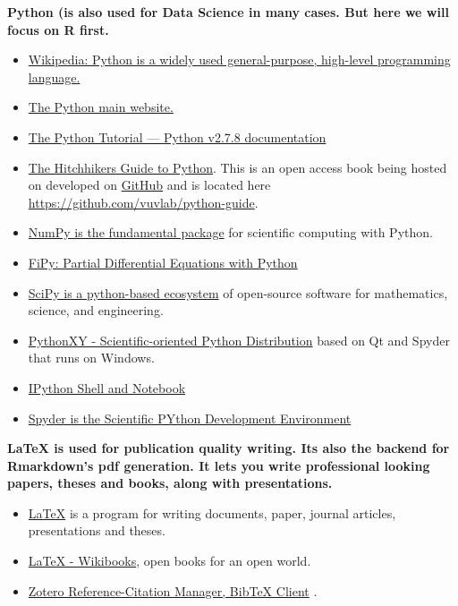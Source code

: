 \documentclass[10pt]{article} %
\begin{document}
  {\bf Python (is also used for Data Science in many cases.
    But here we will focus on R first. }
    \begin{itemize}
    	\item \href{"https://en.wikipedia.org/wiki/Python_(programming_language)"}{Wikipedia: Python is a widely used general-purpose, high-level programming language. }  \cite{python_python_2014}
    	\item \href{"https://www.python.org/"}{The Python main website. } \cite{python_python.org_2013}
    	\item \href{"https://docs.python.org/2/tutorial/"}{The Python Tutorial — Python v2.7.8 documentation}  \cite{python_python_2014}
    	\item \href{"http://docs.python-guide.org/en/latest/"}{The Hitchhikers Guide to Python}. This is an open access book being hosted on developed on \href{"https://github.com/"}{GitHub} and is located here \href{"https://github.com/vuvlab/python-guide"}{https://github.com/vuvlab/python-guide}. \cite{_hitchhikers_2014} \cite{_kennethreitz/python-guide_2014}
    	\item \href{"http://www.numpy.org"}{NumPy is the fundamental package} \cite{numpy_numpy_2014} for scientific computing with Python.
    	\item \href{"http://www.ctcms.nist.gov/fipy/"}{FiPy: Partial Differential Equations with Python} \cite{guyer_fipy:_2009}
    	\item \href{"http://www.scipy.org/"}{SciPy is a python-based ecosystem}  \cite{scipy_scipy.org_2014} of open-source software for mathematics, science, and engineering.
    	\item \href{"https://code.google.com/p/pythonxy/"}{PythonXY - Scientific-oriented Python Distribution} based on Qt and Spyder that runs on Windows.  \cite{pythonxy_pythonxy_2014}
    	\item \href{"http://ipython.org/index.html"}{IPython Shell and Notebook}  \cite{ipython_ipython_2014}
    	\item \href{"https://code.google.com/p/spyderlib/"}{Spyder is the Scientific PYthon Development Environment}  \cite{spyder_spyder_2014}
    \end{itemize}

  {\bf LaTeX is used for publication quality writing.
    Its also the backend for Rmarkdown's pdf generation.
    It lets you write professional looking papers, theses and books, along with presentations. }
    \begin{itemize}
    	\item \href{"http://www.tug.org/"}{LaTeX} is a program for writing documents, paper, journal articles, presentations and theses\cite{_tex_2014}.
    	\item \href{"http://en.wikibooks.org/wiki/LaTeX"}{LaTeX - Wikibooks}, open books for an open world\cite{latex_latex_2014}.
    	\item \href{"https://www.zotero.org/"}{Zotero Reference-Citation Manager, BibTeX Client}  \cite{zotero_zotero_2014}.
    \end{itemize}
\end{document}
